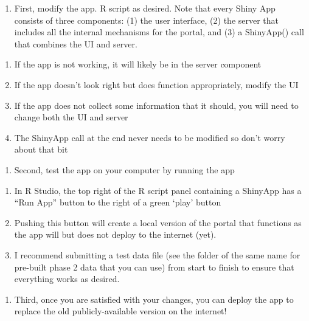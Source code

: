 \documentclass[
  letterpaper,
  oneside,
  open=any]{scrbook}
\providecommand{\tightlist}{%
  \setlength{\itemsep}{0pt}\setlength{\parskip}{0pt}}\usepackage{longtable,booktabs,array}
\begin{document}
\begin{enumerate}
  \begin{enumerate}
  \def\labelenumii{\arabic{enumii}.}
  \tightlist
  \item
    First, modify the app. R script as desired. Note that every Shiny
    App consists of three components: (1) the user interface, (2) the
    server that includes all the internal mechanisms for the portal, and
    (3) a ShinyApp() call that combines the UI and server.
  \end{enumerate}

  \begin{enumerate}
  \def\labelenumii{\roman{enumii}.}
  \item
    If the app is not working, it will likely be in the server component
  \item
    If the app doesn't look right but does function appropriately,
    modify the UI
  \item
    If the app does not collect some information that it should, you
    will need to change both the UI and server
  \item
    The ShinyApp call at the end never needs to be modified so don't
    worry about that bit
  \end{enumerate}

  \begin{enumerate}
  \def\labelenumii{\arabic{enumii}.}
  \setcounter{enumii}{1}
  \tightlist
  \item
    Second, test the app on your computer by running the app
  \end{enumerate}

  \begin{enumerate}
  \def\labelenumii{\roman{enumii}.}
  \item
    In R Studio, the top right of the R script panel containing a
    ShinyApp has a ``Run App'' button to the right of a green `play'
    button
  \item
    Pushing this button will create a local version of the portal that
    functions as the app will but does not deploy to the internet (yet).
  \item
    I recommend submitting a test data file (see the folder of the same
    name for pre-built phase 2 data that you can use) from start to
    finish to ensure that everything works as desired.
  \end{enumerate}

  \begin{enumerate}
  \def\labelenumii{\arabic{enumii}.}
  \setcounter{enumii}{2}
  \tightlist
  \item
    Third, once you are satisfied with your changes, you can deploy the
    app to replace the old publicly-available version on the internet!
  \end{enumerate}


\end{enumerate}
\end{document}
